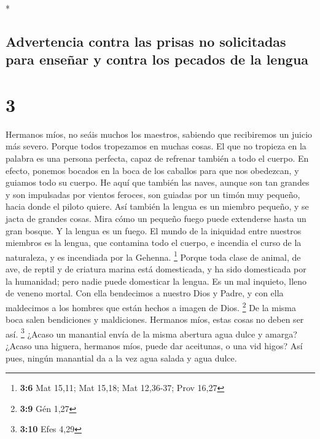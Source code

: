 \begin{paracol}{2}
\switchcolumn[0]*

\hypertarget{advertencia-contra-las-prisas-no-solicitadas-para-enseuxf1ar-y-contra-los-pecados-de-la-lengua}{%
\subsection{Advertencia contra las prisas no solicitadas para enseñar y
contra los pecados de la
lengua}\label{advertencia-contra-las-prisas-no-solicitadas-para-enseuxf1ar-y-contra-los-pecados-de-la-lengua}}

\hypertarget{section-4}{%
\section{3}\label{section-4}}

 Hermanos míos, no seáis muchos los maestros, sabiendo que
recibiremos un juicio más severo.  Porque todos tropezamos
en muchas cosas. El que no tropieza en la palabra es una persona
perfecta, capaz de refrenar también a todo el cuerpo.  En
efecto, ponemos bocados en la boca de los caballos para que nos
obedezcan, y guiamos todo su cuerpo.  He aquí que también
las naves, aunque son tan grandes y son impulsadas por vientos feroces,
son guiadas por un timón muy pequeño, hacia donde el piloto quiere.
 Así también la lengua es un miembro pequeño, y se jacta
de grandes cosas. Mira cómo un pequeño fuego puede extenderse hasta un
gran bosque.  Y la lengua es un fuego. El mundo de la
iniquidad entre nuestros miembros es la lengua, que contamina todo el
cuerpo, e incendia el curso de la naturaleza, y es incendiada por la
Gehenna. \footnote{\textbf{3:6} Mat 15,11; Mat 15,18; Mat 12,36-37; Prov
  16,27}  Porque toda clase de animal, de ave, de reptil y
de criatura marina está domesticada, y ha sido domesticada por la
humanidad;  pero nadie puede domesticar la lengua. Es un
mal inquieto, lleno de veneno mortal.  Con ella bendecimos
a nuestro Dios y Padre, y con ella maldecimos a los hombres que están
hechos a imagen de Dios. \footnote{\textbf{3:9} Gén 1,27}
 De la misma boca salen bendiciones y maldiciones.
Hermanos míos, estas cosas no deben ser así. \footnote{\textbf{3:10}
  Efes 4,29}  ¿Acaso un manantial envía de la misma
abertura agua dulce y amarga?  ¿Acaso una higuera,
hermanos míos, puede dar aceitunas, o una vid higos? Así pues, ningún
manantial da a la vez agua salada y agua dulce.


\end{paracol}
